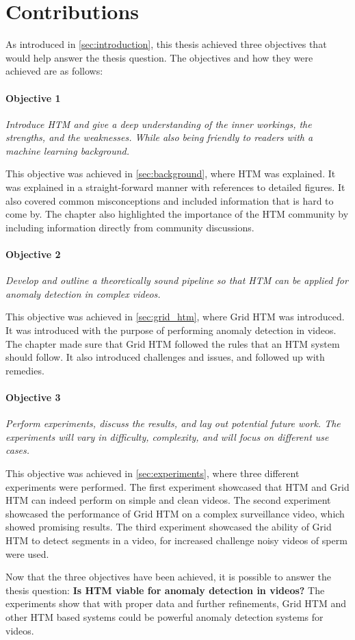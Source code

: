 \section{Contributions}
As introduced in \autoref{sec:introduction}, this thesis achieved three objectives that would help answer the thesis question. The objectives and how they were achieved are as follows:
\par
\paragraph*{Objective 1} \emph{Introduce HTM and give a deep understanding of the inner workings, the strengths, and the weaknesses. While also being friendly to readers with a machine learning background.}
\par
This objective was achieved in \autoref{sec:background}, where HTM was explained. It was explained in a straight-forward manner with references to detailed figures. It also covered common misconceptions and included information that is hard to come by. The chapter also highlighted the importance of the HTM community by including information directly from community discussions.
\paragraph*{Objective 2} \emph{Develop and outline a theoretically sound pipeline so that HTM can be applied for anomaly detection in complex videos.}
\par
This objective was achieved in \autoref{sec:grid_htm}, where Grid HTM was introduced. It was introduced with the purpose of performing anomaly detection in videos. The chapter made sure that Grid HTM followed the rules that an HTM system should follow. It also introduced challenges and issues, and followed up with remedies.
\paragraph*{Objective 3} \emph{Perform experiments, discuss the results, and lay out potential future work. The experiments will vary in difficulty, complexity, and will focus on different use cases.}
\par
This objective was achieved in \autoref{sec:experiments}, where three different experiments were performed. The first experiment showcased that HTM and Grid HTM can indeed perform on simple and clean videos. The second experiment showcased the performance of Grid HTM on a complex surveillance video, which showed promising results. The third experiment showcased the ability of Grid HTM to detect segments in a video, for increased challenge noisy videos of sperm were used.
\par
Now that the three objectives have been achieved, it is possible to answer the thesis question: \textbf{Is HTM viable for anomaly detection in videos?} The experiments show that with proper data and further refinements, Grid HTM and other HTM based systems could be powerful anomaly detection systems for videos.
